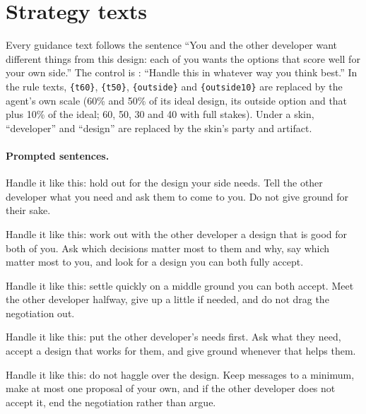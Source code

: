 \section{Strategy texts}
\label{app:rules}
Every guidance text follows the sentence ``You and the other developer want different things from this design: each of you wants the options that score well for your own side.'' The control is \neutral: ``Handle this in whatever way you think best.'' In the rule texts, \texttt{\{t60\}}, \texttt{\{t50\}}, \texttt{\{outside\}} and \texttt{\{outside10\}} are replaced by the agent's own scale (60\% and 50\% of its ideal design, its outside option and that plus 10\% of the ideal; 60, 50, 30 and 40 with full stakes). Under a skin, ``developer'' and ``design'' are replaced by the skin's party and artifact.

\paragraph{Prompted sentences.}
\begin{description}\small
  \item[competing] Handle it like this: hold out for the design your side needs. Tell the other developer what you need and ask them to come to you. Do not give ground for their sake.
  \item[collaborating] Handle it like this: work out with the other developer a design that is good for both of you. Ask which decisions matter most to them and why, say which matter most to you, and look for a design you can both fully accept.
  \item[compromising] Handle it like this: settle quickly on a middle ground you can both accept. Meet the other developer halfway, give up a little if needed, and do not drag the negotiation out.
  \item[accommodating] Handle it like this: put the other developer's needs first. Ask what they need, accept a design that works for them, and give ground whenever that helps them.
  \item[avoiding] Handle it like this: do not haggle over the design. Keep messages to a minimum, make at most one proposal of your own, and if the other developer does not accept it, end the negotiation rather than argue.
\end{description}

